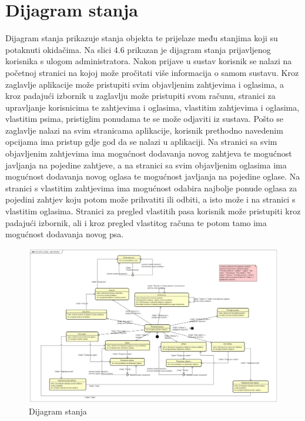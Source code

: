 			\eject
		
		\section{Dijagram stanja}
			
			
			
			
			Dijagram stanja prikazuje stanja objekta te prijelaze među stanjima koji su potaknuti okidačima. Na slici 4.6 prikazan je dijagram stanja prijavljenog korisnika s ulogom administratora. Nakon prijave u sustav korisnik se nalazi na početnoj stranici na kojoj može pročitati više informacija o samom sustavu. Kroz zaglavlje aplikacije može pristupiti svim objavljenim zahtjevima i oglasima, a kroz padajući izbornik u zaglavlju može pristupiti svom računu, stranici za upravljanje korisnicima te zahtjevima i oglasima, vlastitim zahtjevima i oglasima, vlastitim psima, pristiglim ponudama te se može odjaviti iz sustava. Pošto se zaglavlje nalazi na svim stranicama aplikacije, korisnik prethodno navedenim opcijama ima pristup gdje god da se nalazi u aplikaciji. Na stranici sa svim objavljenim zahtjevima ima mogućnost dodavanja novog zahtjeva te mogućnost javljanja na pojedine zahtjeve, a na stranici sa svim objavljenim oglasima ima mogućnost dodavanja novog oglasa te mogućnost javljanja na pojedine oglase. Na stranici s vlastitim zahtjevima ima mogućnost odabira najbolje ponude oglasa za pojedini zahtjev koju potom može prihvatiti ili odbiti, a isto može i na stranici s vlastitim oglasima. Stranici za pregled vlastitih pasa korisnik može pristupiti kroz padajući izbornik, ali i kroz pregled vlastitog računa te potom tamo ima mogućnost dodavanja novog psa.
			
			
			\begin{figure}[htb]
				\centering
				\includegraphics[width=15cm]{slike/dijagramStanja}
				\caption{Dijagram stanja}
				\label{fig:Class-Diagram}
			\end{figure}
			
